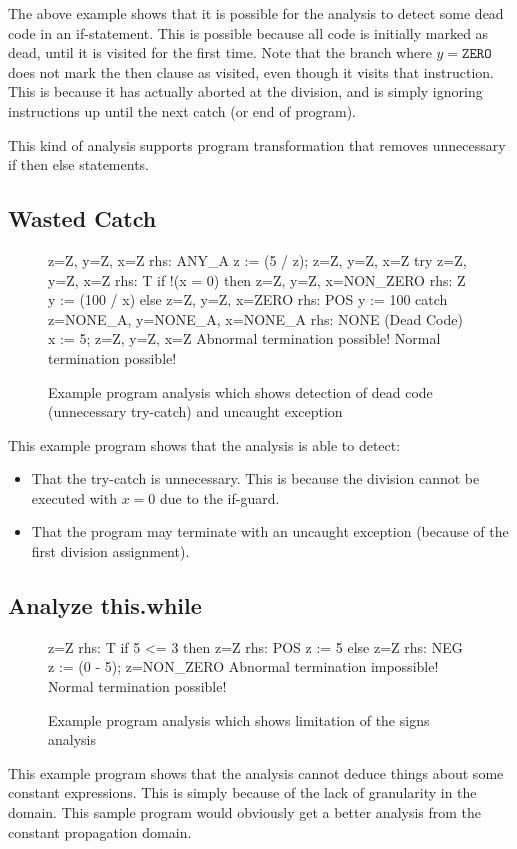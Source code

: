 \documentclass[a4paper,11pt]{article}
\begin{document}
The above example shows that it is possible for the analysis to detect some dead code in an if-statement.
This is possible because all code is initially marked as dead, until it is visited for the first time.
Note that the branch where $y=\texttt{ZERO}$ does not mark the then clause as visited,
even though it visits that instruction.
This is because it has actually aborted at the division, and is simply ignoring instructions up until the next catch (or end of program).

This kind of analysis supports program transformation that removes unnecessary if then else statements.

\clearpage
\subsection{Wasted Catch}
\begin{figure}[h!]
\centering
\begin{verbatimtab}[4]
{z=Z, y=Z, x=Z} rhs: ANY_A
z := (5 / z);
{z=Z, y=Z, x=Z}
try
    {z=Z, y=Z, x=Z} rhs: T
    if !(x = 0) then
        {z=Z, y=Z, x=NON_ZERO} rhs: Z
        y := (100 / x)
    else
        {z=Z, y=Z, x=ZERO} rhs: POS
        y := 100
catch
    {z=NONE_A, y=NONE_A, x=NONE_A} rhs: NONE (Dead Code)
    x := 5;
{z=Z, y=Z, x=Z}
Abnormal termination possible!
Normal termination possible!
\end{verbatimtab}
\label{waste_catch.while}
\caption{Example program analysis which shows detection of dead code (unnecessary try-catch) and uncaught exception}
\end{figure}

This example program shows that the analysis is able to detect:

\begin{itemize}
\item	That the try-catch is unnecessary. This is because the division cannot be executed with $x = 0$ due to the if-guard.
\item	That the program may terminate with an uncaught exception (because of the first division assignment).
\end{itemize}

\clearpage
\subsection{Analyze this.while}
\begin{figure}[h!]
\centering
\begin{verbatimtab}[4]
{z=Z} rhs: T
if 5 <= 3 then
    {z=Z} rhs: POS
    z := 5
else
    {z=Z} rhs: NEG
    z := (0 - 5);
{z=NON_ZERO}
Abnormal termination impossible!
Normal termination possible!
\end{verbatimtab}
\label{waste_catch.while}
\caption{Example program analysis which shows limitation of the signs analysis}
\end{figure}

This example program shows that the analysis cannot deduce things about some constant expressions.
This is simply because of the lack of granularity in the domain.
This sample program would obviously get a better analysis from the constant propagation domain.
\end{document}
